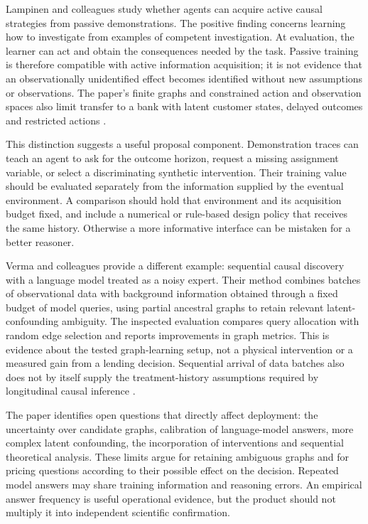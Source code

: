 Lampinen and colleagues study whether agents can acquire active causal
strategies from passive demonstrations. The positive finding concerns learning
how to investigate from examples of competent investigation. At evaluation,
the learner can act and obtain the consequences needed by the task. Passive
training is therefore compatible with active information acquisition; it is
not evidence that an observationally unidentified effect becomes identified
without new assumptions or observations. The paper's finite graphs and
constrained action and observation spaces also limit transfer to a bank with
latent customer states, delayed outcomes and restricted actions
\cite{v12_la_2305_16183}.

This distinction suggests a useful proposal component. Demonstration traces
can teach an agent to ask for the outcome horizon, request a missing
assignment variable, or select a discriminating synthetic intervention. Their
training value should be evaluated separately from the information supplied
by the eventual environment. A comparison should hold that environment and
its acquisition budget fixed, and include a numerical or rule-based design
policy that receives the same history. Otherwise a more informative interface
can be mistaken for a better reasoner.

Verma and colleagues provide a different example: sequential causal discovery
with a language model treated as a noisy expert. Their method combines batches
of observational data with background information obtained through a fixed
budget of model queries, using partial ancestral graphs to retain relevant
latent-confounding ambiguity. The inspected evaluation compares query
allocation with random edge selection and reports improvements in graph
metrics. This is evidence about the tested graph-learning setup, not a
physical intervention or a measured gain from a lending decision. Sequential
arrival of data batches also does not by itself supply the treatment-history
assumptions required by longitudinal causal inference
\cite{v12_la_2506_16234}.

The paper identifies open questions that directly affect deployment: the
uncertainty over candidate graphs, calibration of language-model answers,
more complex latent confounding, the incorporation of interventions and
sequential theoretical analysis. These limits argue for retaining ambiguous
graphs and for pricing questions according to their possible effect on the
decision. Repeated model answers may share training information and reasoning
errors. An empirical answer frequency is useful operational evidence, but
the product should not multiply it into independent scientific confirmation.

